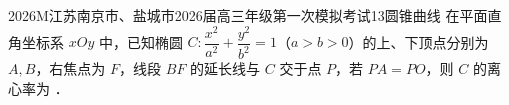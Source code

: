 
\begin{problem}{2026}{M}{江苏南京市、盐城市2026届高三年级第一次模拟考试}{13}{圆锥曲线}
在平面直角坐标系 $xOy$ 中，已知椭圆 $C:\dfrac{x^2}{a^2}+\dfrac{y^2}{b^2}=1$（$a>b>0$）的上、下顶点分别为 $A,B$，右焦点为 $F$，线段 $BF$ 的延长线与 $C$ 交于点 $P$，若 $PA=PO$，则 $C$ 的离心率为 \underline{\hspace{4em}}．
\end{problem}